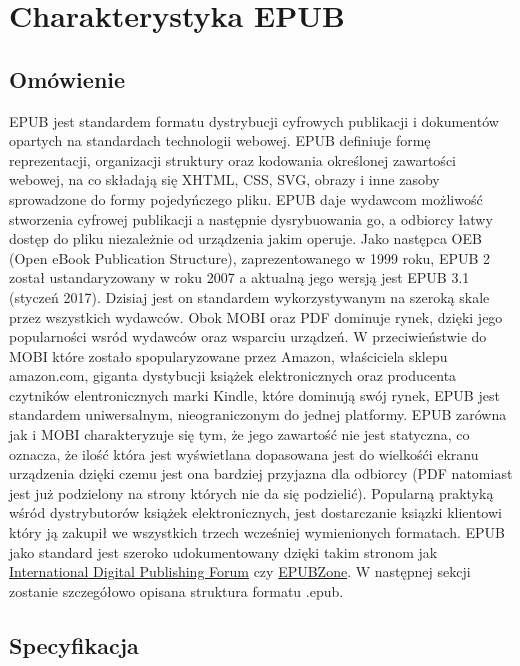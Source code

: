 \chapter{Charakterystyka EPUB}

\section{Omówienie}

EPUB jest standardem formatu dystrybucji cyfrowych publikacji i dokumentów opartych na standardach technologii webowej. EPUB definiuje
formę reprezentacji, organizacji struktury oraz kodowania określonej zawartości webowej, na co składają się XHTML, CSS, SVG, obrazy i
inne zasoby sprowadzone do formy pojedyńczego pliku. EPUB daje wydawcom możliwość stworzenia cyfrowej publikacji a następnie dysrybuowania
go, a odbiorcy łatwy dostęp do pliku niezależnie od urządzenia jakim operuje. Jako następca OEB (Open eBook Publication Structure),
zaprezentowanego w 1999 roku, EPUB 2 został ustandaryzowany w roku 2007 a aktualną jego wersją jest EPUB 3.1 (styczeń 2017). Dzisiaj jest
on standardem wykorzystywanym na szeroką skale przez wszystkich wydawców. Obok MOBI oraz PDF dominuje rynek, dzięki jego popularności
wsród wydawców oraz wsparciu urządzeń. W przeciwieństwie do MOBI które zostało spopularyzowane przez Amazon, właściciela sklepu amazon.com,
giganta dystybucji książek elektronicznych oraz producenta czytników elentronicznych marki Kindle, które dominują swój rynek, EPUB jest
standardem uniwersalnym, nieograniczonym do jednej platformy. EPUB zarówna jak i MOBI charakteryzuje się tym, że jego zawartość nie jest
statyczna, co oznacza, że ilość która jest wyświetlana dopasowana jest do wielkośći ekranu urządzenia dzięki czemu jest ona bardziej
przyjazna dla odbiorcy (PDF natomiast jest już podzielony na strony których nie da się podzielić). Popularną praktyką wśród dystrybutorów
książek elektronicznych, jest dostarczanie ksiązki klientowi który ją zakupił we wszystkich trzech wcześniej wymienionych formatach.
EPUB jako standard jest szeroko udokumentowany dzięki takim stronom jak \href{idpf.org}{International Digital Publishing Forum} czy
\href{epubzone.org}{EPUBZone}. W następnej sekcji zostanie szczegółowo opisana struktura formatu .epub.

\section{Specyfikacja}
